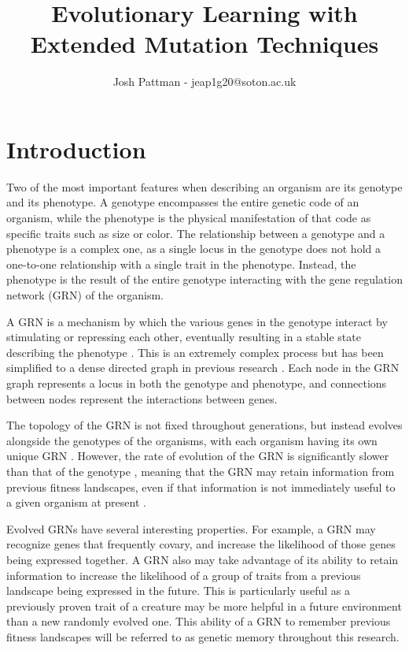 \documentclass[twocolumn,a4paper,11pt]{article}
\author{Josh Pattman - jeap1g20@soton.ac.uk}
\title{Evolutionary Learning with Extended Mutation Techniques}
\begin{document}
	\maketitle
    \section{Introduction}
    Two of the most important features when describing an organism are its genotype and its phenotype. A genotype encompasses the entire genetic code of an organism, while the phenotype is the physical manifestation of that code as specific traits such as size or color. The relationship between a genotype and a phenotype is a complex one, as a single locus in the genotype does not hold a one-to-one relationship with a single trait in the phenotype. Instead, the phenotype is the result of the entire genotype interacting with the gene regulation network (GRN) of the organism.

    A GRN is a mechanism by which the various genes in the genotype interact by stimulating or repressing each other, eventually resulting in a stable state describing the phenotype \cite{what-is-grn}. This is an extremely complex process but has been simplified to a dense directed graph in previous research \cite{grn-1}. Each node in the GRN graph represents a locus in both the genotype and phenotype, and connections between nodes represent the interactions between genes.
    
    The topology of the GRN is not fixed throughout generations, but instead evolves alongside the genotypes of the organisms, with each organism having its own unique GRN \cite{evolving-grns}. However, the rate of evolution of the GRN is significantly slower than that of the genotype \cite{evo-speed-grn}, meaning that the GRN may retain information from previous fitness landscapes, even if that information is not immediately useful to a given organism at present \cite{grn-learn-from-past}.

    Evolved GRNs have several interesting properties. For example, a GRN may recognize genes that frequently covary, and increase the likelihood of those genes being expressed together. A GRN also may take advantage of its ability to retain information to increase the likelihood of a group of traits from a previous landscape being expressed in the future. This is particularly useful as a previously proven trait of a creature may be more helpful in a future environment than a new randomly evolved one. This ability of a GRN to remember previous fitness landscapes will be referred to as genetic memory throughout this research.
\end{document}
